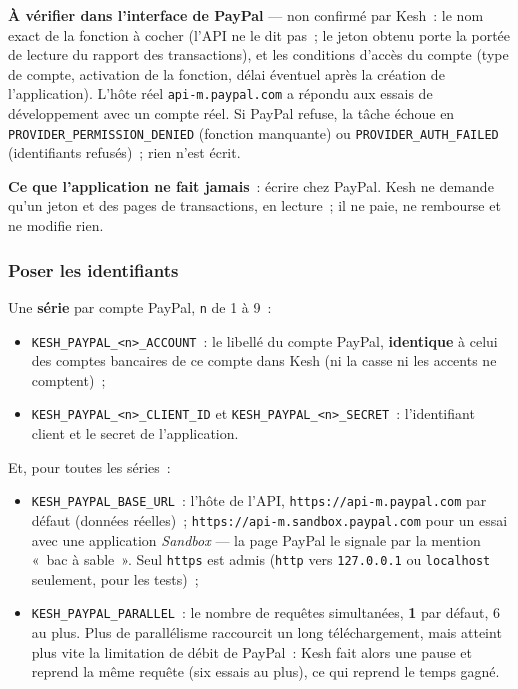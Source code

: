 \documentclass[a4paper,11pt,oneside]{article}
\begin{document}
\begin{keshwarning}
\textbf{À vérifier dans l'interface de PayPal} --- non confirmé par Kesh~: le nom exact de la fonction à cocher (l'API ne le dit pas~; le jeton obtenu porte la portée de lecture du rapport des transactions), et les conditions d'accès du compte (type de compte, activation de la fonction, délai éventuel après la création de l'application). L'hôte réel \texttt{api-m.paypal.com} a répondu aux essais de développement avec un compte réel. Si PayPal refuse, la tâche échoue en \texttt{PROVIDER\_PERMISSION\_DENIED} (fonction manquante) ou \texttt{PROVIDER\_AUTH\_FAILED} (identifiants refusés)~; rien n'est écrit.
\end{keshwarning}

\textbf{Ce que l'application ne fait jamais}~: écrire chez PayPal. Kesh ne demande qu'un jeton et des pages de transactions, en lecture~; il ne paie, ne rembourse et ne modifie rien.

\subsubsection{Poser les identifiants}

Une \textbf{série} par compte PayPal, \texttt{n} de 1 à 9~:
\begin{itemize}
    \item \texttt{KESH\_PAYPAL\_<n>\_ACCOUNT}~: le libellé du compte PayPal, \textbf{identique} à celui des comptes bancaires de ce compte dans Kesh (ni la casse ni les accents ne comptent)~;
    \item \texttt{KESH\_PAYPAL\_<n>\_CLIENT\_ID} et \texttt{KESH\_PAYPAL\_<n>\_SECRET}~: l'identifiant client et le secret de l'application.
\end{itemize}
Et, pour toutes les séries~:
\begin{itemize}
    \item \texttt{KESH\_PAYPAL\_BASE\_URL}~: l'hôte de l'API, \texttt{https://api-m.paypal.com} par défaut (données réelles)~; \texttt{https://api-m.sandbox.paypal.com} pour un essai avec une application \emph{Sandbox} --- la page PayPal le signale par la mention «~bac à sable~». Seul \texttt{https} est admis (\texttt{http} vers \texttt{127.0.0.1} ou \texttt{localhost} seulement, pour les tests)~;
    \item \texttt{KESH\_PAYPAL\_PARALLEL}~: le nombre de requêtes simultanées, \textbf{1} par défaut, 6 au plus. Plus de parallélisme raccourcit un long téléchargement, mais atteint plus vite la limitation de débit de PayPal~: Kesh fait alors une pause et reprend la même requête (six essais au plus), ce qui reprend le temps gagné.
\end{itemize}
\end{document}
